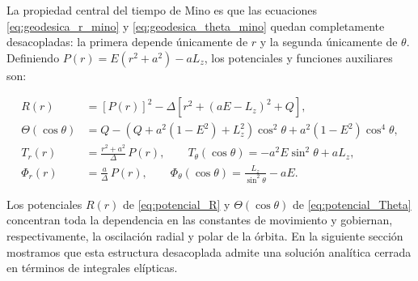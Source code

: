 La propiedad central del tiempo de Mino es que las ecuaciones \eqref{eq:geodesica_r_mino} y \eqref{eq:geodesica_theta_mino} quedan completamente desacopladas: la primera depende únicamente de $r$ y la segunda únicamente de $\theta$. Definiendo $P(r) = E(r^2 + a^2) - aL_z$, los potenciales y funciones auxiliares son:

\begin{align}
    R(r) &= \left[P(r)\right]^2 - \Delta\left[r^2 + (aE - L_z)^2 + Q\right], \label{eq:potencial_R} \\
    \Theta(\cos\theta) &= Q - \left(Q + a^2(1-E^2) + L_z^2\right)\cos^2\theta + a^2(1-E^2)\cos^4\theta, \label{eq:potencial_Theta} \\
    T_r(r) &= \frac{r^2 + a^2}{\Delta}\,P(r), \qquad T_\theta(\cos\theta) = -a^2 E\sin^2\theta + aL_z, \\
    \Phi_r(r) &= \frac{a}{\Delta}\,P(r), \qquad \Phi_\theta(\cos\theta) = \frac{L_z}{\sin^2\theta} - aE.
\end{align}

Los potenciales $R(r)$ de \eqref{eq:potencial_R} y $\Theta(\cos\theta)$ de \eqref{eq:potencial_Theta} concentran toda la dependencia en las constantes de movimiento y gobiernan, respectivamente, la oscilación radial y polar de la órbita. En la siguiente sección mostramos que esta estructura desacoplada admite una solución analítica cerrada en términos de integrales elípticas.
